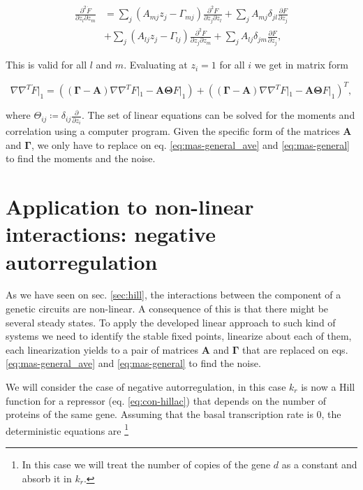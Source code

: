 \begin{equation*}
  \begin{split}
    \frac{\partial^2\dot{F}}{\partial z_l \partial z_m} &= \sum_j\left(A_{mj}z_j-\Gamma_{mj}\right)\frac{\partial^2F}{\partial z_j\partial z_l} + \sum_jA_{mj}\delta_{jl}\frac{\partial F}{\partial z_j}\\
    &+\sum_j\left(A_{lj}z_j-\Gamma_{lj}\right)\frac{\partial^2F}{\partial z_j\partial z_m} + \sum_jA_{lj}\delta_{jm}\frac{\partial F}{\partial z_j},
  \end{split}
\end{equation*}

This is valid for all $l$ and $m$. Evaluating at $z_i=1$ for all $i$ we get in matrix form

\begin{equation}
  \label{eq:mas-general}
  \nabla\nabla^T\dot{F}|_1 = \left(\left(\mathbf{\Gamma} - \mathbf{A}\right)\nabla\nabla^TF|_1 - \mathbf{A}\mathbf{\Theta} F|_1\right)+\left(\left(\mathbf{\Gamma} - \mathbf{A}\right)\nabla\nabla^TF|_1 - \mathbf{A}\mathbf{\Theta} F|_1\right)^T,
\end{equation}

where $\Theta_{ij} \coloneqq \delta_{ij}\frac{\partial}{\partial z_i}$. The set of linear equations can be solved for the moments and correlation using a computer program. Given the specific form of the matrices $\mathbf{A}$ and $\mathbf{\Gamma}$, we only have to replace on eq. \eqref{eq:mas-general_ave} and \eqref{eq:mas-general} to find the moments and the noise.

\section{Application to non-linear interactions: negative autorregulation}
\label{sec:mas-neg_autorreg}

As we have seen on sec. \ref{sec:hill}, the interactions between the component of a genetic circuits are non-linear. A consequence of this is that there might be several steady states. To apply the developed linear approach to such kind of systems we need to identify the stable fixed points, linearize about each of them, each linearization yields to a pair of matrices $\mathbf{A}$ and $\mathbf{\Gamma}$  that are replaced on eqs. \eqref{eq:mas-general_ave} and \eqref{eq:mas-general} to find the noise.

We will consider the case of negative autorregulation, in this case $k_r$ is now a Hill function for a repressor (eq. \eqref{eq:con-hillac}) that depends on the number of proteins of the same gene. Assuming that the basal transcription rate is $0$, the deterministic equations are \footnote{In this case we will treat the number of copies of the gene $d$ as a constant and absorb it in $k_r$.}

